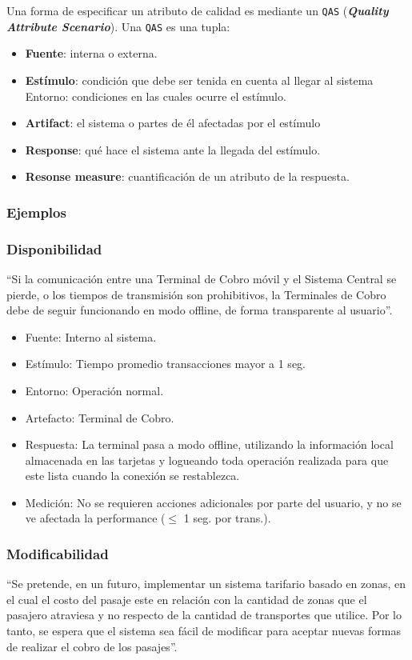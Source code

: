 \documentclass[]{article}
\begin{document}
Una forma de especificar un atributo de calidad es mediante un \texttt{QAS} (\textbf{\emph{Quality Attribute Scenario}}). Una \texttt{QAS} es una tupla:
\begin{itemize}
	\item \textbf{Fuente}: interna o externa.
	\item \textbf{Estímulo}: condición que debe ser tenida en cuenta al llegar al sistema Entorno: condiciones en las cuales ocurre el estímulo.
	\item \textbf{Artifact}: el sistema o partes de él afectadas por el estímulo
	\item \textbf{Response}: qué hace el sistema ante la llegada del estímulo.
	\item \textbf{Resonse measure}: cuantificación de un atributo de la respuesta.
\end{itemize}

\subsubsection{Ejemplos}
\subsubsection{Disponibilidad}
``Si la comunicación entre una Terminal de Cobro móvil y el Sistema Central se pierde, o los tiempos de transmisión son prohibitivos, la Terminales de Cobro debe de seguir funcionando en modo offline, de forma transparente al usuario''.

\begin{itemize}
	\item Fuente: Interno al sistema.
	\item Estímulo: Tiempo promedio transacciones mayor a 1 seg.
	\item Entorno: Operación normal.
	\item Artefacto: Terminal de Cobro.
	\item Respuesta: La terminal pasa a modo offline, utilizando la información local almacenada en las tarjetas y logueando toda operación realizada para que este lista cuando la conexión se restablezca.
	\item Medición: No se requieren acciones adicionales por parte del usuario, y no se ve afectada la performance ($\leq$ 1 seg. por trans.).
\end{itemize}


\subsubsection{Modificabilidad}
``Se pretende, en un futuro, implementar un sistema tarifario basado en zonas, en el cual el costo del pasaje este en relación con la cantidad de zonas que el pasajero atraviesa y no respecto de la cantidad de transportes que utilice. Por lo tanto, se espera que el sistema sea fácil de modificar para aceptar nuevas formas de realizar el cobro de los pasajes''.
\end{document}
